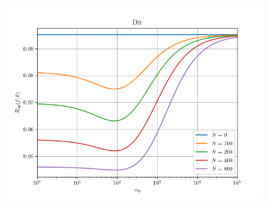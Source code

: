 \documentclass[aspectratio=169]{beamer}
\begin{document}
\begin{frame}
\begin{columns}[c]
\begin{column}{.5\linewidth}

\begin{figure}
	\centering
	\includegraphics[width=1\linewidth]{Discrete/SE/risk_a0_leg_N.png}
	\label{fig:Discrete/SE/risk_a0_leg_N}
\end{figure} 

\end{column}

\end{columns}

\end{frame}
\end{document}
